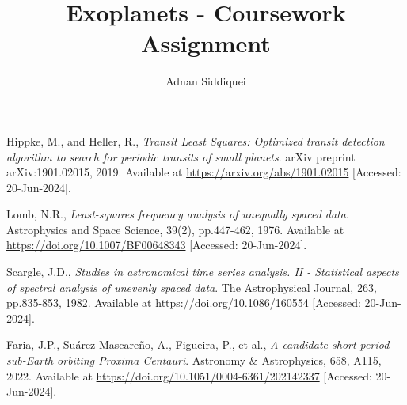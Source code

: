 \documentclass[a4paper,11pt]{article}
\title{\boldmath Exoplanets - Coursework Assignment}
\author{Adnan Siddiquei}
\affiliation{University of Cambridge}
\newcommand{\inlinecode}[1]{\texttt{\seqsplit{#1}}}
\begin{document}
\maketitle
\flushbottom



\clearpage


\clearpage
\appendix


\begin{thebibliography}{99}

    Hippke, M., and Heller, R.,
    \textit{Transit Least Squares: Optimized transit detection algorithm to search for periodic transits of small planets}.
    arXiv preprint arXiv:1901.02015, 2019.
    Available at \url{https://arxiv.org/abs/1901.02015} [Accessed: 20-Jun-2024].

    Lomb, N.R.,
    \textit{Least-squares frequency analysis of unequally spaced data}.
    Astrophysics and Space Science, 39(2), pp.447-462, 1976.
    Available at \url{https://doi.org/10.1007/BF00648343} [Accessed: 20-Jun-2024].

    Scargle, J.D.,
    \textit{Studies in astronomical time series analysis. II - Statistical aspects of spectral analysis of unevenly spaced data}.
    The Astrophysical Journal, 263, pp.835-853, 1982.
    Available at \url{https://doi.org/10.1086/160554} [Accessed: 20-Jun-2024].

    Faria, J.P., Suárez Mascareño, A., Figueira, P., et al.,
    \textit{A candidate short-period sub-Earth orbiting Proxima Centauri}.
    Astronomy \& Astrophysics, 658, A115, 2022.
    Available at \url{https://doi.org/10.1051/0004-6361/202142337} [Accessed: 20-Jun-2024].


\end{thebibliography}
\end{document}
